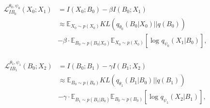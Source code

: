 \vskip -0.2cm
\begin{align}
\begin{aligned}
\mathcal{L}_{IB_{0}}^{\theta _{0},\psi _{0} } \left ( X_{0}; X_{1} \right ) &= I\left ( X_{0}; B_{0} \right )-\beta I\left ( B_{0}; X_{1} \right ) \\
&\approx \mathbb{E} _{X_{0}\sim p(X_{0}) } KL\left ( q_{\theta _{0}}\left ( B_{0}|X_{0} \right ) ||q\left ( B_{0} \right ) \right ) \\
& -\beta\cdot \mathbb{E} _{B_{0}\sim p(B_{0}|X_{0})}\mathbb{E} _{X_{0}\sim p(X_{0}) }\left [ \log_{}{q_{\psi _{0} } \left ( X_{1}|B_{0}  \right )  }  \right ],
\end{aligned}
\label{Tlossfunc1}
\end{align}

\vskip -0.2cm

\vskip -0.2cm
\begin{align}
\begin{aligned}
\mathcal{L}_{IB_{1}}^{\theta _{1},\psi _{1} } \left ( B_{0}; X_{2} \right ) &= I\left ( B_{0}; B_{1} \right )-\gamma I\left ( B_{1}; X_{2} \right ) \\
&\approx \mathbb{E} _{B_{0}\sim p(B_{0}) } KL\left ( q_{\theta _{1}}\left ( B_{1}|B_{0} \right ) ||q\left ( B_{1} \right ) \right ) \\
& -\gamma\cdot \mathbb{E} _{B_{1}\sim p(B_{1}|B_{0})}\mathbb{E} _{B_{0}\sim p(B_{0}) }\left [ \log_{}{q_{\psi _{1} } \left ( X_{2}|B_{1}  \right )  }   \right ],
\end{aligned}
\label{Tlossfunc2}
\end{align}

\vskip -0.2cm